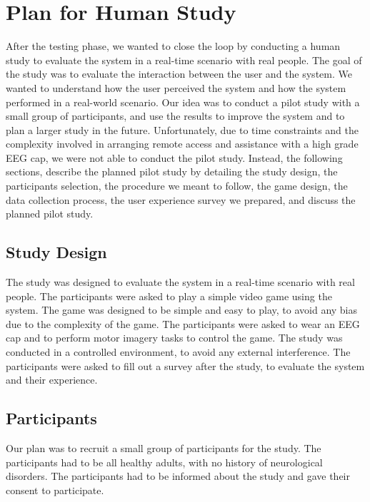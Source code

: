 \chapter{Plan for Human Study}\label{ch:human_study}
After the testing phase, we wanted to close the loop by conducting a human study to evaluate the system in a real-time scenario with real people.
The goal of the study was to evaluate the interaction between the user and the system. 
We wanted to understand how the user perceived the system and how the system performed in a real-world scenario. 
Our idea was to conduct a pilot study with a small group of participants, and use the results to improve the system and to plan a larger study in the future.
Unfortunately, due to time constraints and the complexity involved in arranging remote access and assistance with a high grade EEG cap, we were not able to conduct the pilot study.
Instead, the following sections, describe the planned pilot study by detailing the study design, the participants selection, the procedure we meant to follow, the game design, the data collection process, the user experience survey we prepared, and discuss the planned pilot study.


\section{Study Design}
The study was designed to evaluate the system in a real-time scenario with real people.
The participants were asked to play a simple video game using the system.
The game was designed to be simple and easy to play, to avoid any bias due to the complexity of the game.
The participants were asked to wear an EEG cap and to perform motor imagery tasks to control the game.
The study was conducted in a controlled environment, to avoid any external interference.
The participants were asked to fill out a survey after the study, to evaluate the system and their experience.

\section{Participants}
Our plan was to recruit a small group of participants for the study.
The participants had to be all healthy adults, with no history of neurological disorders.
The participants had to be informed about the study and gave their consent to participate.

